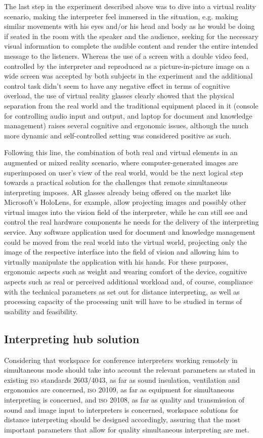 \documentclass[output=paper]{langsci/langscibook}
\begin{document}
The last step in the experiment described above was to dive into a virtual reality scenario, making the interpreter feel immersed in the situation, e.g. making similar movements with his eyes and/or his head and body as he would be doing if seated in the room with the speaker and the audience, seeking for the necessary visual information to complete the audible content and render the entire intended message to the listeners. Whereas the use of a screen with a double video feed, controlled by the interpreter and reproduced as a picture-in-picture image on a wide screen was accepted by both subjects in the experiment and the additional control task didn’t seem to have any negative effect in terms of cognitive overload, the use of virtual reality glasses clearly showed that the physical separation from the real world and the traditional equipment placed in it (console for controlling audio input and output, and laptop for document and knowledge management) raises several cognitive and ergonomic issues, although the much more dynamic and self-controlled setting was considered positive as such. 

Following this line, the combination of both real and virtual elements in an augmented or mixed reality scenario, where computer-generated images are superimposed on user’s view of the real world, would be the next logical step towards a practical solution for the challenges that remote simultaneous interpreting imposes. \textsc{AR} glasses already being offered on the market like Microsoft’s HoloLens, for example, allow projecting images and possibly other virtual images into the vision field of the interpreter, while he can still see and control the real hardware components he needs for the delivery of the interpreting service. Any software application used for document and knowledge management could be moved from the real world into the virtual world, projecting only the image of the respective interface into the field of vision and allowing him to virtually manipulate the application with his hands. For these purposes, ergonomic aspects such as weight and wearing comfort of the device, cognitive aspects such as real or perceived additional workload and, of course, compliance with the technical parameters as set out for distance interpreting, as well as processing capacity of the processing unit will have to be studied in terms of usability and feasibility.

\subsection{Interpreting hub solution}
\label{sub:ziegler:6.2}
Considering that workspace for conference interpreters working remotely in simultaneous mode should take into account the relevant parameters as stated in existing \textsc{iso} standards 2603/4043, as far as sound insulation, ventilation and ergonomics are concerned, \textsc{iso} 20109, as far as equipment for simultaneous interpreting is concerned, and \textsc{iso} 20108, as far as quality and transmission of sound and image input to interpreters is concerned, workspace solutions for distance interpreting should be designed accordingly, assuring that the most important parameters that allow for quality simultaneous interpreting are met.
\end{document}
